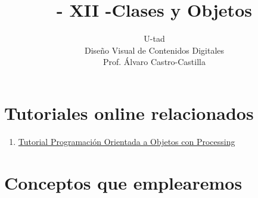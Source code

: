\documentclass[a4paper,oneside]{article}
\title{- XII -\linebreak Clases y Objetos}
\author{U-tad\\ Diseño Visual de Contenidos Digitales\\ Prof. Álvaro Castro-Castilla}
\date{}
\begin{document}
\maketitle


\section{Tutoriales online relacionados}
\begin{enumerate}
  \item \href{http://processing.org/learning/objects/}{Tutorial Programación Orientada a Objetos con Processing}
\end{enumerate}


\section{Conceptos que emplearemos}
\end{document}
